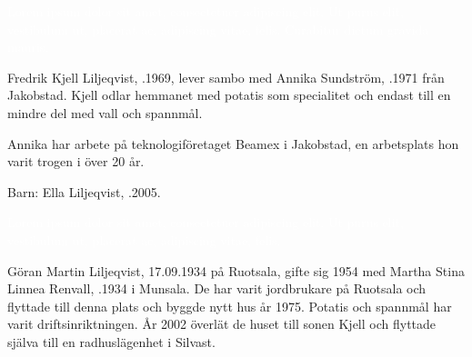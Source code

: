 \textcolor{white}{Lorem ipsum dolor sit amet, consectetuer adipiscing elit. Ut purus elit, vestibulum ut, placerat ac, adipiscing vitae, felis. Curabitur dictum gravida mauris.} %

%



%
Fredrik Kjell Liljeqvist, .1969, lever sambo med Annika Sundström, .1971 från Jakobstad.  Kjell odlar hemmanet med potatis som specialitet och endast till en mindre del med vall och spannmål.

Annika har arbete på teknologiföretaget Beamex i Jakobstad, en arbetsplats hon varit trogen i över 20 år.

Barn: Ella Liljeqvist, .2005.

\textcolor{white}{Lorem ipsum dolor sit amet, consectetuer adipiscing elit. Ut purus elit, vestibulum ut, placerat ac, adipiscing vitae, felis.} %

%
Göran Martin Liljeqvist, 17.09.1934 på Ruotsala, gifte sig 1954 med Martha Stina Linnea Renvall, .1934 i Munsala. De har varit jordbrukare på Ruotsala och flyttade till denna plats och byggde nytt hus år 1975. Potatis och spannmål har varit driftsinriktningen. År 2002 överlät de huset till sonen Kjell och flyttade själva till en radhuslägenhet i Silvast.
\begin{jhchildren}
  \item {}
  \item {}
  \item {}
  \item {}
\end{jhchildren}



%


